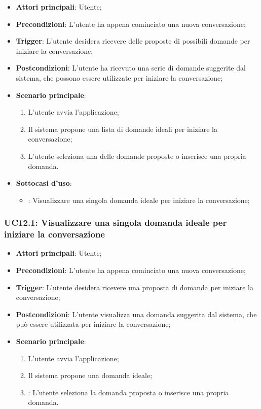 \begin{itemize}
    \item \textbf{Attori principali}: Utente;
    \item \textbf{Precondizioni}: L'utente ha appena cominciato una nuova conversazione;
    \item \textbf{Trigger}: L'utente desidera ricevere delle proposte di possibili domande per iniziare la conversazione;
    \item \textbf{Postcondizioni}: L'utente ha ricevuto una serie di domande suggerite dal sistema, che possono essere utilizzate per iniziare la conversazione;
    \item \textbf{Scenario principale}:
    \begin{enumerate}
        \item L'utente avvia l'applicazione;
        \item Il sistema propone una lista di domande ideali per iniziare la conversazione;
        \item L'utente seleziona una delle domande proposte o inserisce una propria domanda.
    \end{enumerate}
    \item \textbf{Sottocasi d'uso}:
    \begin{itemize}
        \item {}: Visualizzare una singola domanda ideale per iniziare la conversazione;
    \end{itemize}
\end{itemize}

\hypertarget{UC12.1}{}
\subsubsection{UC12.1: Visualizzare una singola domanda ideale per iniziare la conversazione}

\begin{itemize}
    \item \textbf{Attori principali}: Utente;
    \item \textbf{Precondizioni}: L'utente ha appena cominciato una nuova conversazione;
    \item \textbf{Trigger}: L'utente desidera ricevere una proposta di domanda per iniziare la conversazione;
    \item \textbf{Postcondizioni}: L'utente visualizza una domanda suggerita dal sistema, che può essere utilizzata per iniziare la conversazione;
    \item \textbf{Scenario principale}:
    \begin{enumerate}
        \item L'utente avvia l'applicazione;
        \item Il sistema propone una domanda ideale;
        \item {}: L'utente seleziona la domanda proposta o inserisce una propria domanda.
    \end{enumerate}
\end{itemize}


